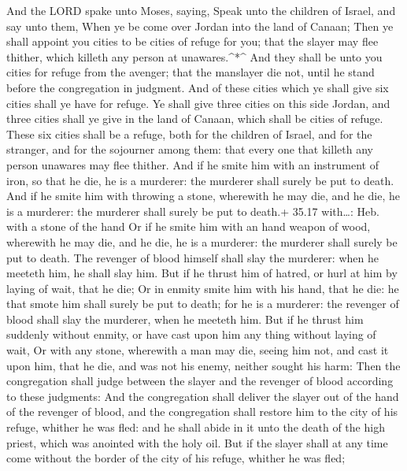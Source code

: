  And the LORD spake unto Moses, saying,  Speak
unto the children of Israel, and say unto them, When ye be come over
Jordan into the land of Canaan;  Then ye shall appoint you
cities to be cities of refuge for you; that the slayer may flee thither,
which killeth any person at unawares.\^{}*\^{}  And they
shall be unto you cities for refuge from the avenger; that the manslayer
die not, until he stand before the congregation in judgment.
 And of these cities which ye shall give six cities shall
ye have for refuge.  Ye shall give three cities on this
side Jordan, and three cities shall ye give in the land of Canaan, which
shall be cities of refuge.  These six cities shall be a
refuge, both for the children of Israel, and for the stranger, and for
the sojourner among them: that every one that killeth any person
unawares may flee thither.  And if he smite him with an
instrument of iron, so that he die, he is a murderer: the murderer shall
surely be put to death.  And if he smite him with throwing
a stone, wherewith he may die, and he die, he is a murderer: the
murderer shall surely be put to death.+ 35.17 with\ldots: Heb. with a
stone of the hand  Or if he smite him with an hand weapon
of wood, wherewith he may die, and he die, he is a murderer: the
murderer shall surely be put to death.  The revenger of
blood himself shall slay the murderer: when he meeteth him, he shall
slay him.  But if he thrust him of hatred, or hurl at him
by laying of wait, that he die;  Or in enmity smite him
with his hand, that he die: he that smote him shall surely be put to
death; for he is a murderer: the revenger of blood shall slay the
murderer, when he meeteth him.  But if he thrust him
suddenly without enmity, or have cast upon him any thing without laying
of wait,  Or with any stone, wherewith a man may die,
seeing him not, and cast it upon him, that he die, and was not his
enemy, neither sought his harm:  Then the congregation
shall judge between the slayer and the revenger of blood according to
these judgments:  And the congregation shall deliver the
slayer out of the hand of the revenger of blood, and the congregation
shall restore him to the city of his refuge, whither he was fled: and he
shall abide in it unto the death of the high priest, which was anointed
with the holy oil.  But if the slayer shall at any time
come without the border of the city of his refuge, whither he was fled;
